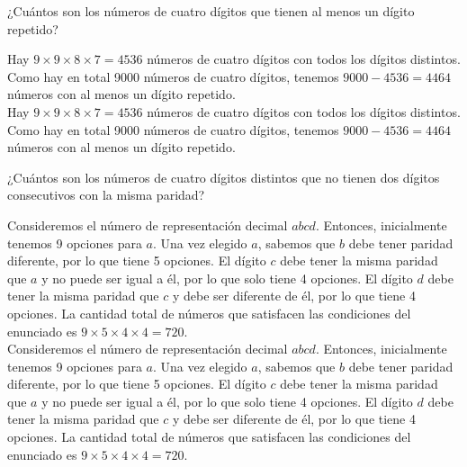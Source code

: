 \documentclass[11pt]{scrartcl}
\begin{document}
\begin{problem}
¿Cuántos son los números de cuatro dígitos que tienen al menos un dígito repetido?
\begin{hint}
Hay $9 \times 9 \times 8 \times 7 = 4536$ números de cuatro dígitos con todos los dígitos distintos. Como hay en total 9000 números de cuatro dígitos, tenemos $9000 - 4536 = 4464$ números con al menos un dígito repetido.\\

Hay $9 \times 9 \times 8 \times 7 = 4536$ números de cuatro dígitos con todos los dígitos distintos. Como hay en total 9000 números de cuatro dígitos, tenemos $9000 - 4536 = 4464$ números con al menos un dígito repetido.
\end{hint}
\end{problem}

\begin{problem}
¿Cuántos son los números de cuatro dígitos distintos que no tienen dos dígitos consecutivos con la misma paridad?
\begin{hint}
Consideremos el número de representación decimal $abcd$. Entonces, inicialmente tenemos 9 opciones para $a$. Una vez elegido $a$, sabemos que $b$ debe tener paridad diferente, por lo que tiene 5 opciones. El dígito $c$ debe tener la misma paridad que $a$ y no puede ser igual a él, por lo que solo tiene 4 opciones. El dígito $d$ debe tener la misma paridad que $c$ y debe ser diferente de él, por lo que tiene 4 opciones. La cantidad total de números que satisfacen las condiciones del enunciado es $9 \times 5 \times 4 \times 4 = 720$.\\

Consideremos el número de representación decimal $abcd$. Entonces, inicialmente tenemos 9 opciones para $a$. Una vez elegido $a$, sabemos que $b$ debe tener paridad diferente, por lo que tiene 5 opciones. El dígito $c$ debe tener la misma paridad que $a$ y no puede ser igual a él, por lo que solo tiene 4 opciones. El dígito $d$ debe tener la misma paridad que $c$ y debe ser diferente de él, por lo que tiene 4 opciones. La cantidad total de números que satisfacen las condiciones del enunciado es $9 \times 5 \times 4 \times 4 = 720$.
\end{hint}
\end{problem}
\end{document}
